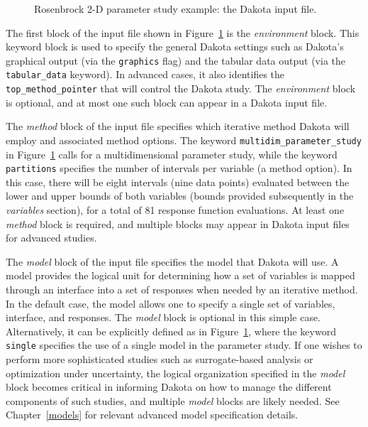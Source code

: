 \begin{figure}[ht!]
  \centering
  \begin{bigbox}
    \begin{small}
    \end{small}
  \end{bigbox}
  \caption{Rosenbrock 2-D parameter study example: the Dakota input
    file.}
  \label{tutorial:rosenbrock_multidim}
\end{figure}

The first block of the input file shown in
Figure~\ref{tutorial:rosenbrock_multidim} is the \emph{environment}
block.  This keyword block is used to specify the general Dakota
settings such as Dakota's graphical output (via the \texttt{graphics}
flag) and the tabular data output (via the
\texttt{tabular\_data} keyword).  In advanced cases, it also
identifies the \texttt{top\_method\_pointer} that will control the
Dakota study.  The \emph{environment} block is optional, and at most
one such block can appear in a Dakota input file.

The \emph{method} block of the input file specifies which iterative
method Dakota will employ and associated method options.
The keyword \texttt{multidim\_parameter\_study} in
Figure~\ref{tutorial:rosenbrock_multidim} calls for a multidimensional
parameter study, while the keyword \texttt{partitions} specifies the
number of intervals per variable (a method option). In this case,
there will be eight intervals (nine data points) evaluated between the
lower and upper bounds of both variables (bounds provided subsequently
in the \emph{variables} section), for a total of 81 response function
evaluations.  At least one \emph{method} block is required, and
multiple blocks may appear in Dakota input files for advanced studies.

The \emph{model} block of the input file specifies the model that
Dakota will use. A model provides the logical unit for determining how
a set of variables is mapped through an interface into a set of
responses when needed by an iterative method. In the default case, the
model allows one to specify a single set of variables, interface, and
responses.  The \emph{model} block is optional in this simple case.
Alternatively, it can be explicitly defined as in
Figure~\ref{tutorial:rosenbrock_multidim}, where the keyword
\texttt{single} specifies the use of a single model in the parameter
study.  If one wishes to perform more sophisticated studies such as
surrogate-based analysis or optimization under uncertainty, the
logical organization specified in the \emph{model} block becomes
critical in informing Dakota on how to manage the different components
of such studies, and multiple \emph{model} blocks are likely needed.
See Chapter~\ref{models} for relevant advanced model specification
details.

